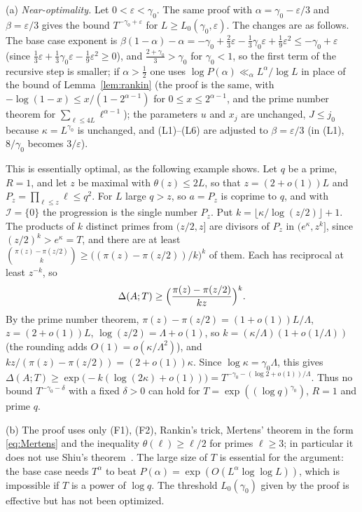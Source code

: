 \begin{remark}\label{rem:optimality}
(a) \emph{Near-optimality.} Let $0<\varepsilon<\gamma_0$. The same proof with $\alpha=\gamma_0-\varepsilon/3$ and $\beta=\varepsilon/3$ gives the bound $T^{-\gamma_0+\varepsilon}$ for $L\ge L_0(\gamma_0,\varepsilon)$. The changes are as follows. The base case exponent is $\beta(1-\alpha)-\alpha=-\gamma_0+\frac23\varepsilon-\frac13\gamma_0\varepsilon+\frac19\varepsilon^2\le-\gamma_0+\varepsilon$ (since $\frac13\varepsilon+\frac13\gamma_0\varepsilon-\frac19\varepsilon^2\ge0$), and $\frac{2+\gamma_0}3>\gamma_0$ for $\gamma_0<1$, so the first term of the recursive step is smaller; if $\alpha>\frac12$ one uses $\log P(\alpha)\ll_\alpha L^\alpha/\log L$ in place of the bound of Lemma~\ref{lem:rankin} (the proof is the same, with $-\log(1-x)\le x/(1-2^{\alpha-1})$ for $0\le x\le 2^{\alpha-1}$, and the prime number theorem for $\sum_{\ell\le4L}\ell^{\alpha-1}$); the parameters $u$ and $x_j$ are unchanged, $J\le j_0$ because $\kappa=L^{\gamma_0}$ is unchanged, and (L1)--(L6) are adjusted to $\beta=\varepsilon/3$ (in (L1), $8/\gamma_0$ becomes $3/\varepsilon$).

This is essentially optimal, as the following example shows. Let $q$ be a prime, $R=1$, and let $z$ be maximal with $\theta(z)\le2L$, so that $z=(2+o(1))L$ and $P_z=\prod_{\ell\le z}\ell\le q^2$. For $L$ large $q>z$, so $a=P_z$ is coprime to $q$, and with $\mathcal I=\{0\}$ the progression is the single number $P_z$. Put $k=\lfloor\kappa/\log(z/2)\rfloor+1$. The products of $k$ distinct primes from $(z/2,z]$ are divisors of $P_z$ in $(e^{\kappa},z^k]$, since $(z/2)^k>e^\kappa=T$, and there are at least $\binom{\pi(z)-\pi(z/2)}k\ge\bigl((\pi(z)-\pi(z/2))/k\bigr)^k$ of them. Each has reciprocal at least $z^{-k}$, so
\[
\Delta(A;T)\ge\Bigl(\frac{\pi(z)-\pi(z/2)}{kz}\Bigr)^k .
\]
By the prime number theorem, $\pi(z)-\pi(z/2)=(1+o(1))L/\Lambda$, $z=(2+o(1))L$, $\log(z/2)=\Lambda+o(1)$, so $k=(\kappa/\Lambda)(1+o(1/\Lambda))$ (the rounding adds $O(1)=o(\kappa/\Lambda^2)$), and $kz/(\pi(z)-\pi(z/2))=(2+o(1))\kappa$. Since $\log\kappa=\gamma_0\Lambda$, this gives $\Delta(A;T)\ge\exp\bigl(-k(\log(2\kappa)+o(1))\bigr)=T^{-\gamma_0-(\log2+o(1))/\Lambda}$. Thus no bound $T^{-\gamma_0-\delta}$ with a fixed $\delta>0$ can hold for $T=\exp((\log q)^{\gamma_0})$, $R=1$ and prime $q$.


(b) The proof uses only (F1), (F2), Rankin's trick, Mertens' theorem in the form \eqref{eq:Mertens} and the inequality $\theta(\ell)\ge\ell/2$ for primes $\ell\ge3$; in particular it does not use Shiu's theorem~\cite{b24}. The large size of $T$ is essential for the argument: the base case needs $T^\alpha$ to beat $P(\alpha)=\exp(O(L^\alpha\log\log L))$, which is impossible if $T$ is a power of $\log q$. The threshold $L_0(\gamma_0)$ given by the proof is effective but has not been optimized.


\end{remark}
